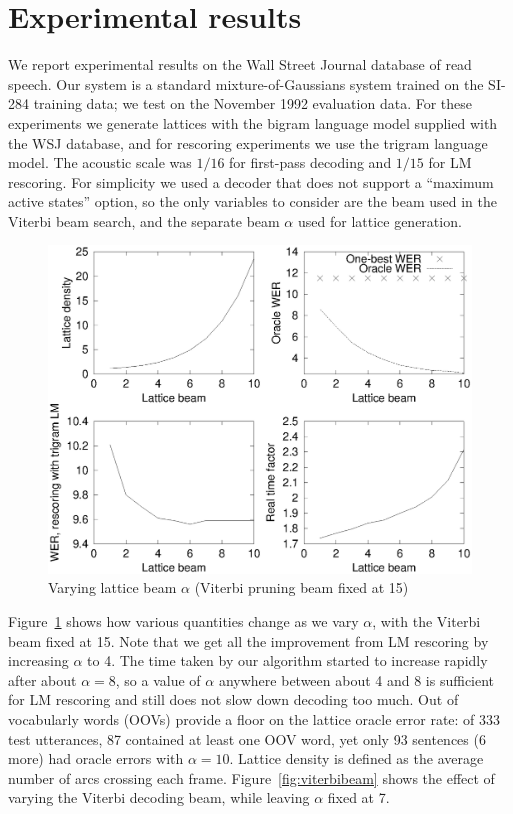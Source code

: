 \documentclass{article}
\begin{document}
\section{Experimental results}
\label{sec:exp}

We report experimental results on the Wall Street Journal database of
read speech.  
Our system is a standard mixture-of-Gaussians system trained on the SI-284
training data; we test on the November 1992 evaluation data.  
For these experiments we generate lattices with the bigram language model
supplied with the WSJ database, and for rescoring experiments we
use the trigram language model.  The acoustic scale was $1/16$ for first-pass
decoding and $1/15$ for LM rescoring.  
For simplicity we used a decoder that
does not support a ``maximum active states'' option, so the only variables
to consider are the beam used in the Viterbi beam search, and the separate
beam $\alpha$ used for lattice generation.


\begin{figure}
\centering
   \includegraphics[width=0.9\columnwidth]{figures/latbeam.eps} 
 \vspace*{-0.1in}
 
   \caption{\vspace*{-0.2in} Varying lattice beam $\alpha$ (Viterbi pruning beam fixed at 15) }
  \label{fig:latbeam}
\end{figure}

Figure~\ref{fig:latbeam} shows how various quantities change as we vary
$\alpha$, with the Viterbi beam fixed at 15.  Note that we get all the improvement from
LM rescoring by increasing $\alpha$ to 4.  The time taken by our algorithm started to increase rapidly after about
$\alpha=8$, so a value of $\alpha$ anywhere between about 4 and 8 is sufficient for LM rescoring 
and still does not slow down decoding too much.
Out of vocabularly words (OOVs) provide a floor on the lattice oracle error rate:
of 333 test utterances, 87 contained at least one OOV word, yet only 93 sentences (6 more) had oracle errors
with $\alpha=10$.  Lattice density is defined as the average number of arcs crossing each frame.
Figure~\ref{fig:viterbibeam} shows the effect of varying the
Viterbi decoding beam, while leaving $\alpha$ fixed at 7.  
\end{document}
